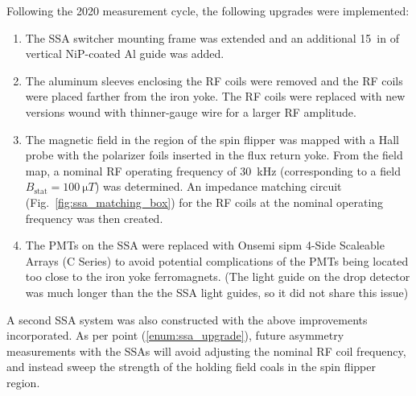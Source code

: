 Following the 2020 measurement cycle, the following upgrades were implemented:
%
\begin{enumerate}
    \item The SSA switcher mounting frame was extended and an additional \qty{15}{in} of vertical NiP-coated Al guide was added.
    \item The aluminum sleeves enclosing the RF coils were removed and the RF coils were placed farther from the iron yoke. The RF coils were replaced with new versions wound with thinner-gauge wire for a larger RF amplitude.
    \item The magnetic field in the region of the spin flipper was mapped with a Hall probe with the polarizer foils inserted in the flux return yoke. From the field map, a nominal RF operating frequency of \qty{30}{kHz} (corresponding to a field $B_\text{stat}=\qty{100}{\micro T}$) was determined. An impedance matching circuit (Fig.~\ref{fig:ssa_matching_box}) for the RF coils at the nominal operating frequency was then created.\label{enum:ssa_upgrade}
    \item The PMTs on the SSA were replaced with Onsemi \acrshort{sipm} 4-Side Scaleable Arrays (C Series) to avoid potential complications of the PMTs being located too close to the iron yoke ferromagnets. (The light guide on the drop detector was much longer than the the SSA light guides, so it did not share this issue)
\end{enumerate}
%
A second SSA system was also constructed with the above improvements incorporated. As per point (\ref{enum:ssa_upgrade}), future asymmetry measurements with the SSAs will avoid adjusting the nominal RF coil frequency, and instead sweep the strength of the holding field coals in the spin flipper region.


